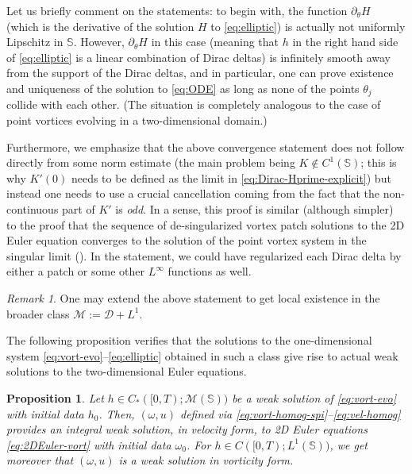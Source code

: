 \documentclass[10pt]{article}
\newtheorem{proposition}[theorem]{Proposition}
\theoremstyle{definition}
\theoremstyle{remark}
\newtheorem{remark}[theorem]{Remark}
\numberwithin{equation}{section}
\newcommand{\0}{\emptyset}
\newcommand{\tht}{\theta}
\newcommand{\omg}{\omega}
\newcommand{\bbS}{\mathbb S}
\newcommand{\calD}{\mathcal D}
\newcommand{\calM}{\mathcal M}
\begin{document}
        Let us briefly comment on the statements: to begin with, the function $\partial_{\theta} H$ (which is the derivative of the solution $H$ to \eqref{eq:elliptic}) is actually not uniformly Lipschitz in $\bbS$. However, $\partial_{\theta} H$ in this case (meaning that $h$ in the right hand side of \eqref{eq:elliptic} is a linear combination of Dirac deltas) is infinitely smooth away from the support of the Dirac deltas, and in particular, one can prove existence and uniqueness of the solution to \eqref{eq:ODE} as long as none of the points $\tht_{j}$ collide with each other. (The situation is completely analogous to the case of point vortices evolving in a two-dimensional domain.) 
        
        Furthermore, we emphasize that the above convergence statement does not follow directly from some norm estimate (the main problem being $K \notin C^1(\bbS)$; this is why $K'(0)$ needs to be defined as the limit in \eqref{eq:Dirac-Hprime-explicit}) but instead one needs to use a crucial cancellation coming from the fact that the non-continuous part of $K'$ is \textit{odd}. In a sense, this proof is similar (although simpler) to the proof that the sequence of de-singularized vortex patch solutions to the 2D Euler equation converges to the solution of the point vortex system in the singular limit (\cite{MP}). In the statement, we could have regularized each Dirac delta by either a patch or some other $L^\infty$ functions as well. 
 
	\begin{remark} One may extend the above statement to get local existence in the broader class $\calM := \calD+L^1$. 
	\end{remark}
	
	
	The following proposition verifies that the solutions to the one-dimensional system \eqref{eq:vort-evo}--\eqref{eq:elliptic} obtained in such a class give rise to actual weak solutions to the two-dimensional Euler equations. 
	\begin{proposition}\label{prop:back-to-2D}
		Let $h \in C_*([0,T);\calM(\bbS))$ be a weak solution of \eqref{eq:vort-evo} with initial data $h_0$. Then, $(\omg, u)$ defined via \eqref{eq:vort-homog-spi}--\eqref{eq:vel-homog} provides an integral weak solution, in velocity form, to 2D Euler equations \eqref{eq:2DEuler-vort} with initial data $\omg_0$. For $h \in C([0,T);L^1(\bbS))$, we get moreover that $(\omg, u)$ is a weak solution in vorticity form.
	\end{proposition} 
	
\end{document}
